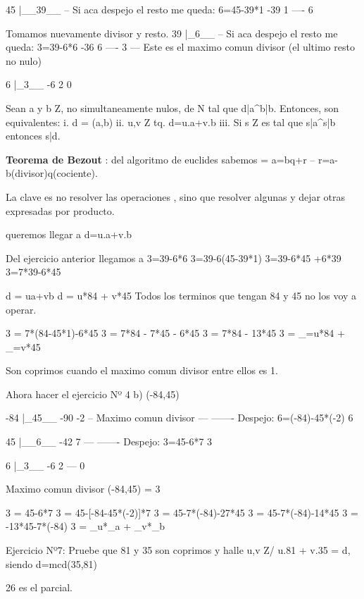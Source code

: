  45 |__39__ -- Si aca despejo el resto me queda: 6=45-39*1
-39  1
----
  6

Tomamos nuevamente divisor y resto.
  39 |_6__ -- Si aca despejo el resto me queda: 3=39-6*6
 -36  6
----
   3 --- Este es el maximo comun divisor (el ultimo resto no nulo)

 6 |_3__
-6  2
 0

Sean a y b \in Z, no simultaneamente nulos, de N tal que d|a^b|b.
Entonces, son equivalentes:
i. d = (a,b)
ii. \exists u,v \in Z tq. d=u.a+v.b
iii. Si s \in Z es tal que s|a^s|b entonces s|d.

\textbf{Teorema de Bezout} :
del algoritmo de euclides sabemos = a=bq+r -- r=a-b(divisor)q(cociente).


La clave es no resolver las operaciones , sino que resolver algunas y dejar otras expresadas por producto.

queremos llegar a d=u.a+v.b

Del ejercicio anterior llegamos a 
3=39-6*6
3=39-6(45-39*1)
3=39-6*45 +6*39
3=7*39-6*45

d = ua+vb
d = u*84 + v*45
Todos los terminos que tengan 84 y 45 no los voy a operar.


3 = 7*(84-45*1)-6*45
3 = 7*84 - 7*45 - 6*45
3 = 7*84 - 13*45
3 = _{=u}*84 + _{=v}*45


Son coprimos cuando el maximo comun divisor entre ellos es 1.

Ahora hacer el ejercicio Nº 4 b) (-84,45)

-84 |_45__
-90  -2 -- Maximo comun divisor
---  ------- Despejo: 6=(-84)-45*(-2)
  6

 45 |__6__
-42  7   
--- ------- Despejo: 3=45-6*7
  3


 6 |_3__
-6  2
--- 
 0

Maximo comun divisor (-84,45) = 3

3 = 45-6*7
3 = 45-[-84-45*(-2)]*7
3 = 45-7*(-84)-27*45
3 = 45-7*(-84)-14*45
3 = -13*45-7*(-84)
3 = _{u}*_{a} + _{v}*_{b}


Ejercicio Nº7: Pruebe que 81 y 35 son coprimos y halle u,v \in Z/ u.81 + v.35 = d, siendo d=mcd(35,81)

26 es el parcial.

























